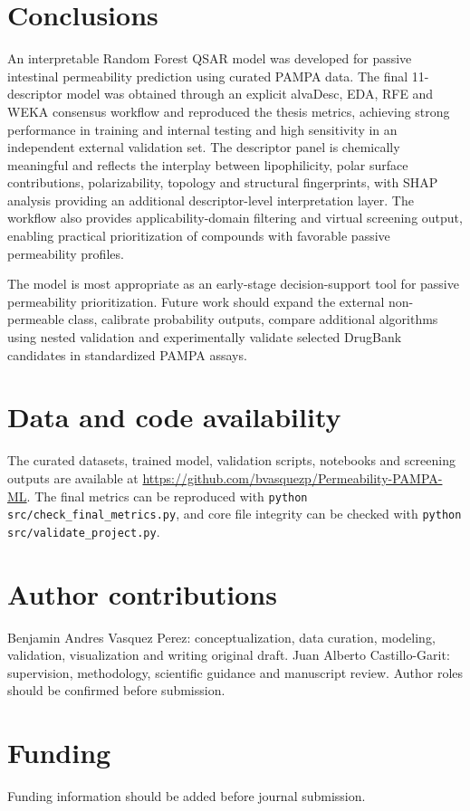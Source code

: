 \documentclass[11pt]{article}
\begin{document}
\section{Conclusions}
An interpretable Random Forest QSAR model was developed for passive intestinal permeability prediction using curated PAMPA data. The final 11-descriptor model was obtained through an explicit alvaDesc, EDA, RFE and WEKA consensus workflow and reproduced the thesis metrics, achieving strong performance in training and internal testing and high sensitivity in an independent external validation set. The descriptor panel is chemically meaningful and reflects the interplay between lipophilicity, polar surface contributions, polarizability, topology and structural fingerprints, with SHAP analysis providing an additional descriptor-level interpretation layer. The workflow also provides applicability-domain filtering and virtual screening output, enabling practical prioritization of compounds with favorable passive permeability profiles.

The model is most appropriate as an early-stage decision-support tool for passive permeability prioritization. Future work should expand the external non-permeable class, calibrate probability outputs, compare additional algorithms using nested validation and experimentally validate selected DrugBank candidates in standardized PAMPA assays.

\section*{Data and code availability}
The curated datasets, trained model, validation scripts, notebooks and screening outputs are available at \url{https://github.com/bvasquezp/Permeability-PAMPA-ML}. The final metrics can be reproduced with \texttt{python src/check\_final\_metrics.py}, and core file integrity can be checked with \texttt{python src/validate\_project.py}.

\section*{Author contributions}
Benjamin Andres Vasquez Perez: conceptualization, data curation, modeling, validation, visualization and writing original draft. Juan Alberto Castillo-Garit: supervision, methodology, scientific guidance and manuscript review. Author roles should be confirmed before submission.

\section*{Funding}
Funding information should be added before journal submission.
\end{document}
